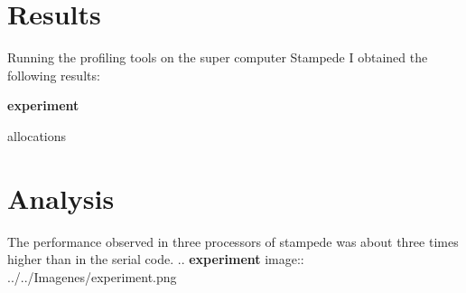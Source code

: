 \documentclass[letterpaper,10pt,english]{sphinxmanual}
\begin{document}
\chapter{Results}
\label{profiling:results}
Running the profiling tools on the super computer Stampede I obtained the following results:

{\color{red}\bfseries{}\textbar{}experiment\textbar{}}

{\color{red}\bfseries{}\textbar{}}allocations


\chapter{Analysis}
\label{profiling:analysis}
The performance observed in three processors of stampede was about three times higher than in the serial code.
.. {\color{red}\bfseries{}\textbar{}experiment\textbar{}} image:: ../../Imagenes/experiment.png



\renewcommand{\indexname}{Index}
\printindex
\end{document}
